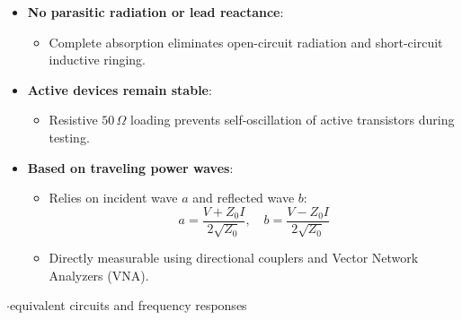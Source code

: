 {\begin{itemize}
\begin{itemize}
    \item Precision $50\,\Omega$ broadband loads are easy to manufacture.
  \end{itemize}
  \item \textbf{No parasitic radiation or lead reactance}:
  \begin{itemize}
    \item Complete absorption eliminates open-circuit radiation and short-circuit inductive ringing.
  \end{itemize}
  \item \textbf{Active devices remain stable}:
  \begin{itemize}
    \item Resistive $50\,\Omega$ loading prevents self-oscillation of active transistors during testing.
  \end{itemize}
  \item \textbf{Based on traveling power waves}:
  \begin{itemize}
    \item Relies on incident wave $a$ and reflected wave $b$:
      \[ a = \frac{V + Z_0 I}{2\sqrt{Z_0}}, \quad b = \frac{V - Z_0 I}{2\sqrt{Z_0}} \]
    \item Directly measurable using directional couplers and Vector Network Analyzers (VNA).
  \end{itemize}
\end{itemize}}

\vspace{2pt}


{\color{sub}\footnotesize {}  \gap$\cdot$\gap equivalent circuits and frequency responses}

